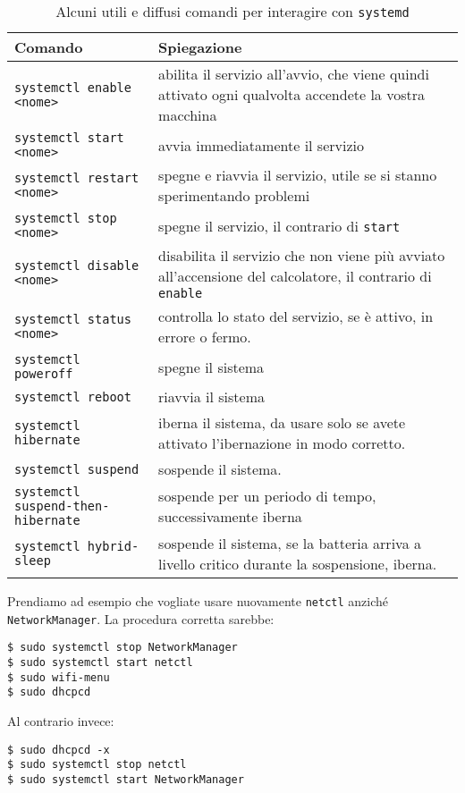 \documentclass[twoside,italian]{book}
\newcommand{\header}[1]{\textbf{\sffamily #1}}
\newcommand{\code}[1]{\texttt{#1}}
\begin{document}
    \begin{table}
        \centering
        \begin{tabular}{lp{}}
            \toprule
            \header{Comando}    &   \header{Spiegazione}\\
            \midrule
            \code{systemctl enable <nome>}  & abilita il servizio all'avvio, che viene quindi attivato ogni qualvolta accendete la vostra macchina\\
            \code{systemctl start <nome>} & avvia immediatamente il servizio \\
            \code{systemctl restart <nome>} & spegne e riavvia il servizio, utile se si stanno sperimentando problemi \\
            \code{systemctl stop <nome>} & spegne il servizio, il contrario di \code{start} \\ 
            \code{systemctl disable <nome>} & disabilita il servizio che non viene più avviato all'accensione del calcolatore, il contrario di \code{enable} \\ 
            \code{systemctl status <nome>} & controlla lo stato del servizio, se è attivo, in errore o fermo. \\
            \code{systemctl poweroff} & spegne il sistema \\
            \code{systemctl reboot} & riavvia il sistema \\
            \code{systemctl hibernate} & iberna il sistema, da usare solo se avete attivato l'ibernazione in modo corretto.\\
            \code{systemctl suspend} & sospende il sistema.\\
            \code{systemctl suspend-then-hibernate} & sospende per un periodo di tempo, successivamente iberna \\
            \code{systemctl hybrid-sleep} & sospende il sistema, se la batteria arriva a livello critico durante la sospensione, iberna. \\
            \bottomrule
        \end{tabular}
        \caption{Alcuni utili e diffusi comandi per interagire con \code{systemd}}
        \label{tab:systemd}
    \end{table}

    Prendiamo ad esempio che vogliate usare nuovamente \code{netctl} anziché \code{NetworkManager}. La procedura corretta sarebbe:
\begin{lstlisting}
$ sudo systemctl stop NetworkManager
$ sudo systemctl start netctl
$ sudo wifi-menu
$ sudo dhcpcd
\end{lstlisting}
    Al contrario invece:
\begin{lstlisting}
$ sudo dhcpcd -x
$ sudo systemctl stop netctl
$ sudo systemctl start NetworkManager
\end{lstlisting}
\end{document}
